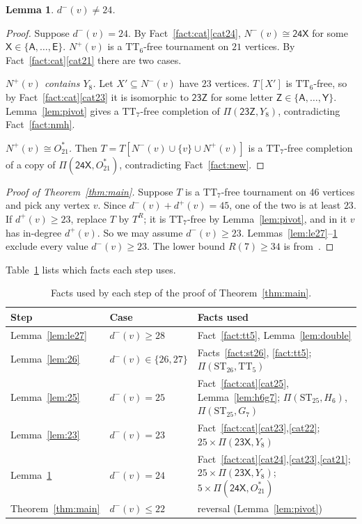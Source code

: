 \documentclass[11pt]{amsart}
\newtheorem{lemma}[theorem]{Lemma}
\theoremstyle{definition}
\theoremstyle{remark}
\newcommand{\TT}[1]{\mathrm{TT}_{#1}}
\newcommand{\ST}[1]{\mathrm{ST}_{#1}}
\newcommand{\Ostar}{O_{21}^{*}}
\newcommand{\cl}[1]{\textsf{#1}}
\newcommand{\Piv}[2]{\Pi(#1,#2)}
\newcommand{\Np}{N^{+}}
\newcommand{\Nm}{N^{-}}
\newcommand{\dpl}{d^{+}}
\newcommand{\dmi}{d^{-}}
\begin{document}
\begin{lemma}\label{lem:24}
$\dmi(v) \ne 24$.
\end{lemma}

\begin{proof}
Suppose $\dmi(v)=24$. By Fact~\ref{fact:cat}\ref{cat24},
$\Nm(v) \cong \cl{24X}$ for some $\cl{X} \in \{\cl{A},\dots,\cl{E}\}$.
$\Np(v)$ is a $\TT{6}$-free tournament on $21$ vertices. By
Fact~\ref{fact:cat}\ref{cat21} there are two cases.

\emph{$\Np(v)$ contains $Y_8$.} Let $X' \subseteq \Nm(v)$ have $23$ vertices.
$T[X']$ is $\TT{6}$-free, so by Fact~\ref{fact:cat}\ref{cat23} it is isomorphic
to $\cl{23Z}$ for some letter $\cl{Z} \in \{\cl{A},\dots,\cl{Y}\}$.
Lemma~\ref{lem:pivot} gives a $\TT{7}$-free completion of
$\Piv{\cl{23Z}}{Y_8}$, contradicting Fact~\ref{fact:nmh}.

\emph{$\Np(v) \cong \Ostar$.} Then $T = T[\Nm(v) \cup \{v\} \cup \Np(v)]$ is a
$\TT{7}$-free completion of a copy of $\Piv{\cl{24X}}{\Ostar}$, contradicting
Fact~\ref{fact:new}.
\end{proof}

\begin{proof}[Proof of Theorem~\ref{thm:main}]
Suppose $T$ is a $\TT{7}$-free tournament on $46$ vertices and pick any vertex
$v$. Since $\dmi(v)+\dpl(v)=45$, one of the two is at least $23$. If
$\dpl(v) \ge 23$, replace $T$ by $T^{R}$; it is $\TT{7}$-free by
Lemma~\ref{lem:pivot}, and in it $v$ has in-degree $\dpl(v)$. So we may assume
$\dmi(v) \ge 23$. Lemmas~\ref{lem:le27}--\ref{lem:24} exclude every value
$\dmi(v) \ge 23$. The lower bound $R(7) \ge 34$ is from~\cite{NMH22}.
\end{proof}

Table~\ref{tab:deps} lists which facts each step uses.

\begin{table}[ht]
\centering\small
\caption{Facts used by each step of the proof of Theorem~\ref{thm:main}.}
\label{tab:deps}
\begin{tabular}{@{}lll@{}}
\toprule
Step & Case & Facts used \\
\midrule
Lemma~\ref{lem:le27} & $\dmi(v) \ge 28$ & Fact~\ref{fact:tt5}, Lemma~\ref{lem:double} \\
Lemma~\ref{lem:26} & $\dmi(v)\in\{26,27\}$ & Facts~\ref{fact:st26}, \ref{fact:tt5}; $\Piv{\ST{26}}{\TT{5}}$ \\
Lemma~\ref{lem:25} & $\dmi(v)=25$ & Fact~\ref{fact:cat}\ref{cat25}, Lemma~\ref{lem:h6g7}; $\Piv{\ST{25}}{H_6}$, $\Piv{\ST{25}}{G_7}$ \\
Lemma~\ref{lem:23} & $\dmi(v)=23$ & Fact~\ref{fact:cat}\ref{cat23},\ref{cat22}; $25\times\Piv{\cl{23X}}{Y_8}$ \\
Lemma~\ref{lem:24} & $\dmi(v)=24$ & Fact~\ref{fact:cat}\ref{cat24},\ref{cat23},\ref{cat21}; $25\times\Piv{\cl{23X}}{Y_8}$; $5\times\Piv{\cl{24X}}{\Ostar}$ \\
Theorem~\ref{thm:main} & $\dmi(v) \le 22$ & reversal (Lemma~\ref{lem:pivot}) \\
\bottomrule
\end{tabular}
\end{table}
\end{document}
